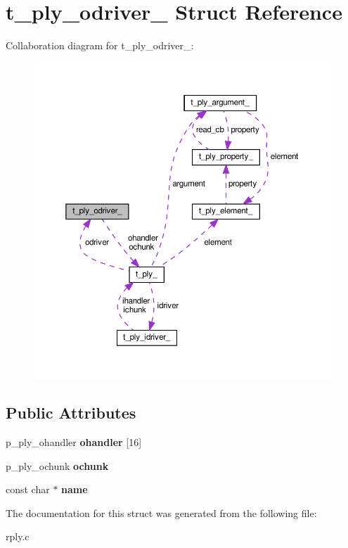 \hypertarget{structt__ply__odriver__}{}\section{t\+\_\+ply\+\_\+odriver\+\_\+ Struct Reference}
\label{structt__ply__odriver__}


Collaboration diagram for t\+\_\+ply\+\_\+odriver\+\_\+\+:\nopagebreak
\begin{figure}[H]
\begin{center}
\leavevmode
\includegraphics[width=350pt]{structt__ply__odriver____coll__graph}
\end{center}
\end{figure}
\subsection*{Public Attributes}
\begin{DoxyCompactItemize}
\item 
\mbox{\label{structt__ply__odriver___a8e73dd635a21a1be2de07c7ead55fb44}} 
p\+\_\+ply\+\_\+ohandler {\bfseries ohandler} \mbox{[}16\mbox{]}
\item 
\mbox{\label{structt__ply__odriver___a02635ba242394795d3716793cd1c3c87}} 
p\+\_\+ply\+\_\+ochunk {\bfseries ochunk}
\item 
\mbox{\label{structt__ply__odriver___a510d75a4c2aa06c9266de2554636f600}} 
const char $\ast$ {\bfseries name}
\end{DoxyCompactItemize}


The documentation for this struct was generated from the following file\+:\begin{DoxyCompactItemize}
\item 
rply.\+c\end{DoxyCompactItemize}
